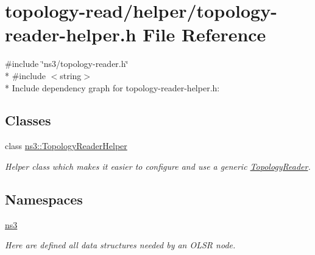 \hypertarget{topology-reader-helper_8h}{}\section{topology-\/read/helper/topology-\/reader-\/helper.h File Reference}
\label{topology-reader-helper_8h}
{\ttfamily \#include \char`\"{}ns3/topology-\/reader.\+h\char`\"{}}\\*
{\ttfamily \#include $<$string$>$}\\*
Include dependency graph for topology-\/reader-\/helper.h\+:
\subsection*{Classes}
\begin{DoxyCompactItemize}
\item 
class \hyperlink{classns3_1_1TopologyReaderHelper}{ns3\+::\+Topology\+Reader\+Helper}
\begin{DoxyCompactList}\small\item\em Helper class which makes it easier to configure and use a generic \hyperlink{classns3_1_1TopologyReader}{Topology\+Reader}. \end{DoxyCompactList}\end{DoxyCompactItemize}
\subsection*{Namespaces}
\begin{DoxyCompactItemize}
\item 
 \hyperlink{namespacens3}{ns3}
\begin{DoxyCompactList}\small\item\em Here are defined all data structures needed by an O\+L\+SR node. \end{DoxyCompactList}\end{DoxyCompactItemize}
